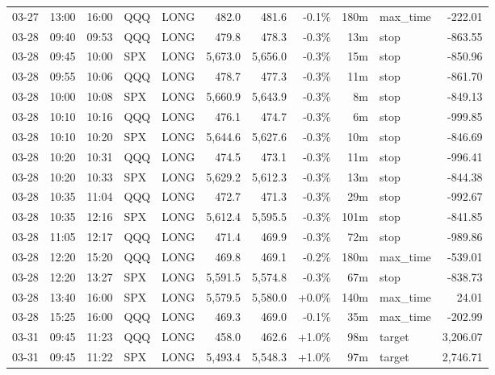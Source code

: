\documentclass[11pt,a4paper,twoside]{article}
\begin{document}
\begin{center}
\begin{longtable}{>{\color{txtmain}}l l l l l r r r r >{\color{txtmain}}l r}
03-27 & 13:00 & 16:00 & QQQ & LONG & 482.0 & 481.6 & \textcolor{lossred}{-0.1\%} & 180m & max\_time & \textcolor{lossred}{-222.01} \\
03-28 & 09:40 & 09:53 & QQQ & LONG & 479.8 & 478.3 & \textcolor{lossred}{-0.3\%} & 13m & stop & \textcolor{lossred}{-863.55} \\
03-28 & 09:45 & 10:00 & SPX & LONG & 5,673.0 & 5,656.0 & \textcolor{lossred}{-0.3\%} & 15m & stop & \textcolor{lossred}{-850.96} \\
03-28 & 09:55 & 10:06 & QQQ & LONG & 478.7 & 477.3 & \textcolor{lossred}{-0.3\%} & 11m & stop & \textcolor{lossred}{-861.70} \\
03-28 & 10:00 & 10:08 & SPX & LONG & 5,660.9 & 5,643.9 & \textcolor{lossred}{-0.3\%} & 8m & stop & \textcolor{lossred}{-849.13} \\
03-28 & 10:10 & 10:16 & QQQ & LONG & 476.1 & 474.7 & \textcolor{lossred}{-0.3\%} & 6m & stop & \textcolor{lossred}{-999.85} \\
03-28 & 10:10 & 10:20 & SPX & LONG & 5,644.6 & 5,627.6 & \textcolor{lossred}{-0.3\%} & 10m & stop & \textcolor{lossred}{-846.69} \\
03-28 & 10:20 & 10:31 & QQQ & LONG & 474.5 & 473.1 & \textcolor{lossred}{-0.3\%} & 11m & stop & \textcolor{lossred}{-996.41} \\
03-28 & 10:20 & 10:33 & SPX & LONG & 5,629.2 & 5,612.3 & \textcolor{lossred}{-0.3\%} & 13m & stop & \textcolor{lossred}{-844.38} \\
03-28 & 10:35 & 11:04 & QQQ & LONG & 472.7 & 471.3 & \textcolor{lossred}{-0.3\%} & 29m & stop & \textcolor{lossred}{-992.67} \\
03-28 & 10:35 & 12:16 & SPX & LONG & 5,612.4 & 5,595.5 & \textcolor{lossred}{-0.3\%} & 101m & stop & \textcolor{lossred}{-841.85} \\
03-28 & 11:05 & 12:17 & QQQ & LONG & 471.4 & 469.9 & \textcolor{lossred}{-0.3\%} & 72m & stop & \textcolor{lossred}{-989.86} \\
03-28 & 12:20 & 15:20 & QQQ & LONG & 469.8 & 469.1 & \textcolor{lossred}{-0.2\%} & 180m & max\_time & \textcolor{lossred}{-539.01} \\
03-28 & 12:20 & 13:27 & SPX & LONG & 5,591.5 & 5,574.8 & \textcolor{lossred}{-0.3\%} & 67m & stop & \textcolor{lossred}{-838.73} \\
03-28 & 13:40 & 16:00 & SPX & LONG & 5,579.5 & 5,580.0 & \textcolor{wingreen}{+0.0\%} & 140m & max\_time & \textcolor{wingreen}{24.01} \\
03-28 & 15:25 & 16:00 & QQQ & LONG & 469.3 & 469.0 & \textcolor{lossred}{-0.1\%} & 35m & max\_time & \textcolor{lossred}{-202.99} \\
03-31 & 09:45 & 11:23 & QQQ & LONG & 458.0 & 462.6 & \textcolor{wingreen}{+1.0\%} & 98m & target & \textcolor{wingreen}{3,206.07} \\
03-31 & 09:45 & 11:22 & SPX & LONG & 5,493.4 & 5,548.3 & \textcolor{wingreen}{+1.0\%} & 97m & target & \textcolor{wingreen}{2,746.71} \\
\end{longtable}
\end{center}
\clearpage
\end{document}
